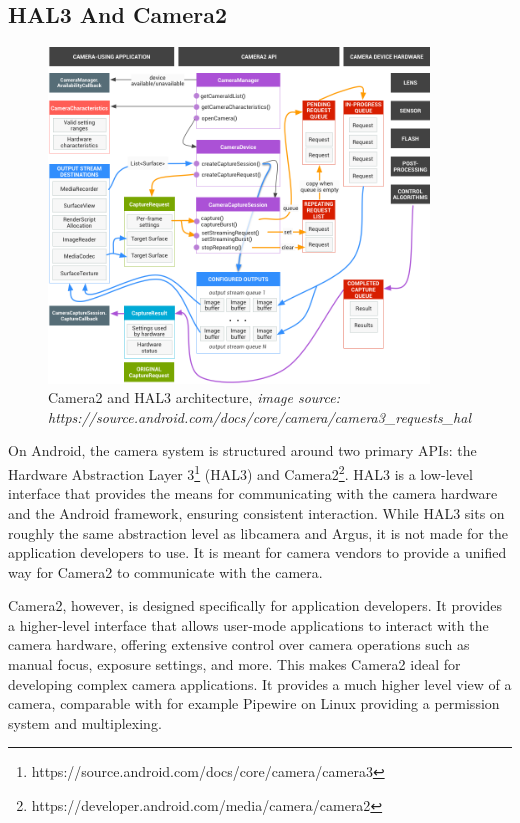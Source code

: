 \subsection{HAL3 And Camera2}
\begin{figure}
    \begin{center}
        \includegraphics[width=0.90\textwidth]{figures/camera2.png}
    \end{center}
    \caption{Camera2 and HAL3 architecture,
    \textit{image source: https://source.android.com/docs/core/camera/camera3\_requests\_hal}}\label{fig:camera2}
\end{figure}


On Android, the camera system is structured around two primary APIs: the
Hardware Abstraction Layer 3\footnote{https://source.android.com/docs/core/camera/camera3} (HAL3)
and Camera2\footnote{https://developer.android.com/media/camera/camera2}. HAL3
is a low-level interface that provides the means for communicating with the
camera hardware and the Android framework, ensuring consistent interaction.
While HAL3 sits on roughly the same abstraction level as libcamera and Argus,
it is not made for the application developers to use. It is meant for camera
vendors to provide a unified way for Camera2 to communicate with the camera.

Camera2, however, is designed specifically for application developers. It
provides a higher-level interface that allows user-mode applications to
interact with the camera hardware, offering extensive control over camera
operations such as manual focus, exposure settings, and more. This makes
Camera2 ideal for developing complex camera applications. It provides a much
higher level view of a camera, comparable with for example Pipewire on Linux
providing a permission system and multiplexing.


